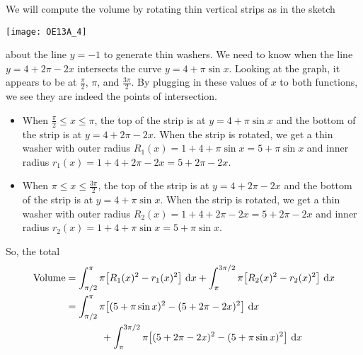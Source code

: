 \begin{solution}
We will compute the volume by rotating thin vertical strips as in
the sketch

\begin{center}
       \texttt{[image: OE13A\_4]}
\end{center}

\noindent
about the line $y=-1$ to generate thin washers.
We need to know when the line $y = 4 + 2\pi - 2x$ intersects the curve
$y = 4 + \pi \sin x$. Looking at the graph, it appears to be at $\frac{\pi}{2}$, $\pi$, and $\frac{3\pi}{2}$. By plugging in these values of $x$ to both functions, we see they are indeed the points of intersection.

\begin{itemize}
\item
When $\frac{\pi}{2} \le x \le \pi$, the top of the strip is at
$y = 4 + \pi \sin x$ and the bottom of the strip is at $y = 4 + 2\pi - 2x$.
When the strip is rotated, we get a thin washer with
outer radius $R_1(x)= 1+ 4 + \pi \sin x=5 + \pi \sin x $ and inner radius
$r_1(x) = 1+4 + 2\pi - 2x=5 + 2\pi - 2x$.
\item
When $\pi \le x \le \frac{3\pi}{2}$, the top of the strip is at
$y = 4 + 2\pi - 2x$ and the bottom of the strip is at $y = 4 + \pi \sin x$.
When the strip is rotated, we get a thin washer with outer radius
$R_2(x) = 1+4 + 2\pi - 2x=5 + 2\pi - 2x$ and inner radius
$r_2(x) = 1+ 4 + \pi \sin x=5 + \pi \sin x$.

\end{itemize}
So, the total
\begin{align*}
\hbox{Volume}
&= \int_{\pi/2}^\pi \pi\big[R_1(x)^2-r_1(x)^2\big]\ \mathrm{d}x
   +\int^{3\pi/2}_\pi \pi\big[R_2(x)^2-r_2(x)^2\big]\ \mathrm{d}x\\
&= \int_{\pi/2}^\pi \pi\big[(5 + \pi \sin x)^2-(5 + 2\pi - 2x)^2\big]\ \mathrm{d}x
    \\ &\hskip0.5in
   +\int^{3\pi/2}_\pi \pi\big[(5 + 2\pi - 2x)^2-(5 + \pi \sin x)^2\big]\
            \mathrm{d}x
\end{align*}
\end{solution}

